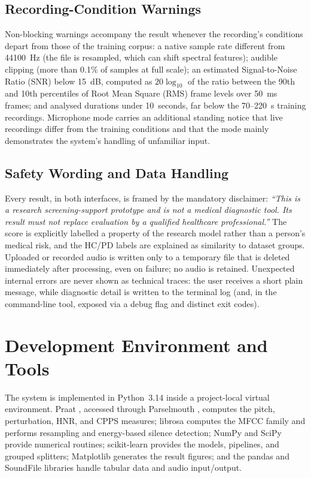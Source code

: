 \subsection{Recording-Condition Warnings}

Non-blocking warnings accompany the result whenever the recording's
conditions depart from those of the training corpus: a native sample
rate different from 44100~Hz (the file is resampled, which can shift
spectral features); audible clipping (more than 0.1\% of samples at
full scale); an estimated Signal-to-Noise Ratio (SNR) below 15~dB,
computed as $20\log_{10}$ of the ratio between the 90th and 10th
percentiles of Root Mean Square (RMS) frame levels over 50~ms frames;
and analysed
durations under 10~seconds, far below the 70--220~s training
recordings. Microphone mode carries an additional standing notice that
live recordings differ from the training conditions and that the mode
mainly demonstrates the system's handling of unfamiliar input.

\subsection{Safety Wording and Data Handling}

Every result, in both interfaces, is framed by the mandatory
disclaimer: \emph{``This is a research screening-support prototype and
is not a medical diagnostic tool. Its result must not replace
evaluation by a qualified healthcare professional.''} The score is
explicitly labelled a property of the research model rather than a
person's medical risk, and the HC/PD labels are explained as
similarity to dataset groups. Uploaded or recorded audio is written
only to a temporary file that is deleted immediately after processing,
even on failure; no audio is retained. Unexpected internal errors are
never shown as technical traces: the user receives a short plain
message, while diagnostic detail is written to the terminal log (and,
in the command-line tool, exposed via a debug flag and distinct exit
codes).

\section{Development Environment and Tools}

The system is implemented in Python~3.14 inside a project-local
virtual environment. Praat \cite{boersma2001}, accessed through
Parselmouth \cite{jadoul2018}, computes the pitch, perturbation, HNR,
and CPPS measures; librosa \cite{mcfee2015} computes the MFCC family
and performs resampling and energy-based silence detection; NumPy
\cite{harris2020} and SciPy \cite{virtanen2020} provide numerical
routines; scikit-learn \cite{pedregosa2011} provides the models,
pipelines, and grouped splitters; Matplotlib \cite{hunter2007}
generates the result figures; and the pandas and SoundFile libraries
handle tabular data and audio input/output.

